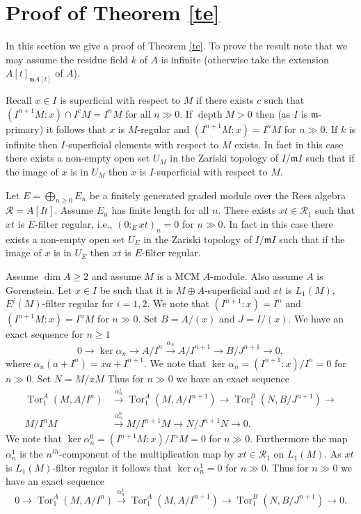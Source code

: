\documentclass{amsart}
\newcommand{\m}{\mathfrak{m} }
\newcommand{\R}{\mathcal{R} }
\newcommand{\rt}{\rightarrow}
\newcommand{\depth}{\operatorname{depth}}
\newcommand{\Tor}{\operatorname{Tor}}
\theoremstyle{plain}
\theoremstyle{definition}
\theoremstyle{remark}
\begin{document}
\section{Proof of Theorem \ref{te}}
In this section we give a proof of Theorem \ref{te}. To prove the result note that we may assume the residue field $k$ of $A$ is infinite (otherwise take the extension $A[t]_{\m A[t]}$ of $A$).

\s Recall $x \in I$ is superficial with respect to $M$ if there exists $c$ such that $(I^{n+1}M \colon x) \cap I^cM = I^nM$ for all $n \gg 0$. If $\depth M > 0$ then (as $I$ is $\m$-primary) it follows that $x$ is $M$-regular and $(I^{n+1}M \colon x) = I^nM$ for $n \gg 0$. If $k$ is infinite then $I$-superficial elements with respect to $M$ exists. In fact in this case there exists a non-empty open set $U_M$ in the Zariski topology of $I/\m I$ such that if the image of $x$ is in $U_M$ then $x$ is $I$-superficial with respect to $M$.

\s Let $E = \bigoplus_{n \geq 0}E_n$ be a finitely generated graded module over the Rees algebra $\R= A[It]$. Assume $E_n$ has finite length for all $n$. There exists $xt \in \R_1$ such that $xt$ is $E$-filter regular, i.e.,  $(0 \colon_E xt)_n = 0$ for $n \gg 0$. In fact in this case there exists a non-empty open set $U_E$ in the Zariski topology of $I/\m I$ such that if the image of $x$ is in $U_E$ then $xt$ is $E$-filter regular.

\s\label{mod-TE} Assume $\dim A  \geq 2$ and assume $M$ is a MCM $A$-module. Also assume $A$ is Gorenstein.  Let $x \in I$ be such that it is $M \oplus A$-superficial and  $xt$ is $L_1(M)$, $E^i(M)$-filter regular for $i = 1, 2$. We note that $(I^{n+1} \colon x) = I^n$ and $(I^{n+1}M \colon x) = I^nM$ for $n \gg 0$. Set $B = A/(x)$ and $J = I/(x)$.
We have an exact sequence for $n \geq 1$
\[
 0 \rt \ker \alpha_n \rt A/I^n \xrightarrow{\alpha_n} A/I^{n+1} \rt B/J^{n+1} \rt 0,
\]
where $\alpha_n(a + I^n) = xa + I^{n+1}$. We note that $\ker \alpha_n  = (I^{n+1} \colon x)/I^n = 0$ for $n \gg 0$. Set $N = M/xM$ Thus for $n \gg 0$ we have an exact sequence
\begin{align*}
  \Tor^A_1(M, A/I^n) &\xrightarrow{\alpha^1_n} \Tor^A_1(M, A/I^{n+1}) \rt \Tor^B_1(N, B/J^{n+1}) \rt \\
 M/I^nM &\xrightarrow{\alpha^0_n}  M/I^{n+1}M \rt N/J^{n+1}N \rt 0.
\end{align*}
We note that $\ker \alpha^0_n = (I^{n+1}M \colon x)/I^nM = 0$ for $n \gg 0$. Furthermore the map $\alpha^1_n$ is the $n^{th}$-component of the multiplication map by $xt \in \R_1$ on $L_1(M)$. As $xt$ is $L_1(M)$-filter regular it follows that $\ker \alpha^1_n = 0$ for $n \gg 0$. Thus for $n \gg 0$ we have an exact sequence
\s\label{t}
 $$0 \rt  \Tor^A_1(M, A/I^n) \xrightarrow{\alpha^1_n} \Tor^A_1(M, A/I^{n+1}) \rt \Tor^B_1(N, B/J^{n+1}) \rt 0.$$
\end{document}

